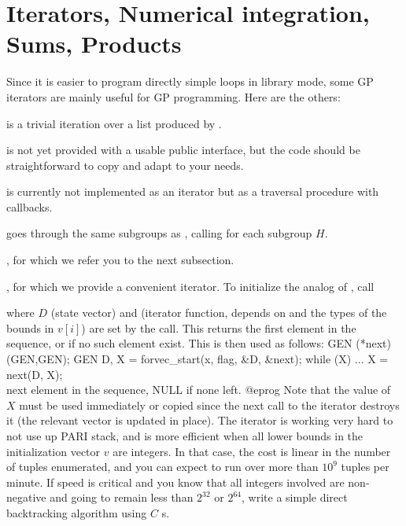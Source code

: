 \section{Iterators, Numerical integration, Sums, Products}
Since it is easier to program directly simple loops in library mode, some GP
iterators are mainly useful for GP programming. Here are the others:

\item {} is a trivial iteration over a list produced by
.

\item {} is not yet provided with a usable public interface, but
the code should be straightforward to copy and adapt to your needs.

\item {} is currently not implemented as an iterator but as a
 traversal procedure with callbacks.

goes through the same subgroups as , calling
 for each subgroup $H$.

\item {}, for which we refer you to the next subsection.

\item {}, for which we provide a convenient iterator. To
initialize the analog of , call

where $D$ (state vector) and  (iterator function, depends
on  and the types of the bounds in $v[i]$) are set by the call.
This returns the first element in the  sequence, or  if
no such element exist. This is then used as follows:
\bprog
  GEN (*next)(GEN,GEN);
  GEN D, X = forvec_start(x, flag, &D, &next);
  while (X) {
    ...
    X = next(D, X);   \\ next element in the sequence, NULL if none left.
  }
@eprog\noindent
Note that the value of $X$ must be used immediately or copied since the next
call to the iterator destroys it (the relevant vector is updated in place).
The iterator is working very hard to not use up PARI stack, and is more
efficient when all lower bounds in the initialization vector $v$ are
integers. In that case, the cost is linear in the number of tuples
enumerated, and you can expect to run over more than $10^9$ tuples per
minute. If speed is critical and you know that all integers involved are
non-negative and going to remain less than $2^{32}$ or $2^{64}$, write a
simple direct backtracking algorithm using $C$ s.


